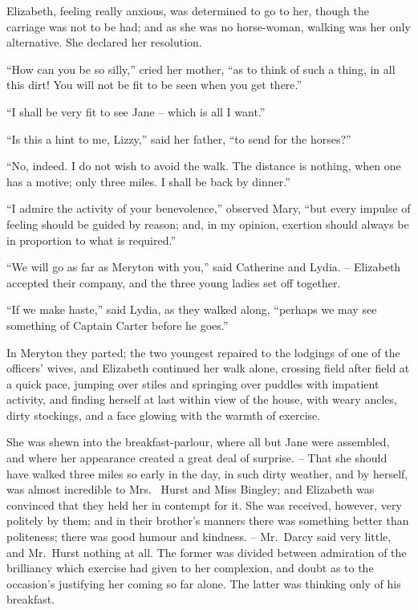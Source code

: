 Elizabeth, feeling really anxious, was determined to go
to her, though the carriage was not to be had; and as
she was no horse-woman, walking was her only alternative.
She declared her resolution.

“How can you be so silly,” cried her mother, “as to
think of such a thing, in all this dirt! You will not be
fit to be seen when you get there.”

“I shall be very fit to see Jane -- which is all I want.”

“Is this a hint to me, Lizzy,” said her father, “to send
for the horses?”

“No, indeed. I do not wish to avoid the walk. The
distance is nothing, when one has a motive; only three
miles. I shall be back by dinner.”

“I admire the activity of your benevolence,” observed
Mary, “but every impulse of feeling should be guided by
reason; and, in my opinion, exertion should always be
in proportion to what is required.”

“We will go as far as Meryton with you,” said Catherine
and Lydia. -- Elizabeth accepted their company, and the
three young ladies set off together.

“If we make haste,” said Lydia, as they walked along,
“perhaps we may see something of Captain Carter before
he goes.”

In Meryton they parted; the two youngest repaired
to the lodgings of one of the officers’ wives, and Elizabeth
continued her walk alone, crossing field after field at a
quick pace, jumping over stiles and springing over puddles
with impatient activity, and finding herself at last within
view of the house, with weary ancles, dirty stockings, and
a face glowing with the warmth of exercise.

She was shewn into the breakfast-parlour, where all
but Jane were assembled, and where her appearance
created a great deal of surprise. -- That she should have
walked three miles so early in the day, in such dirty
weather, and by herself, was almost incredible to Mrs.\ %
Hurst and Miss Bingley; and Elizabeth was convinced
that they held her in contempt for it. She was received,
however, very politely by them; and in their brother’s
manners there was something better than politeness;
there was good humour and kindness. -- Mr.\ Darcy said
very little, and Mr.\ Hurst nothing at all. The former
was divided between admiration of the brilliancy which
exercise had given to her complexion, and doubt as to
the occasion’s justifying her coming so far alone. The
latter was thinking only of his breakfast.

